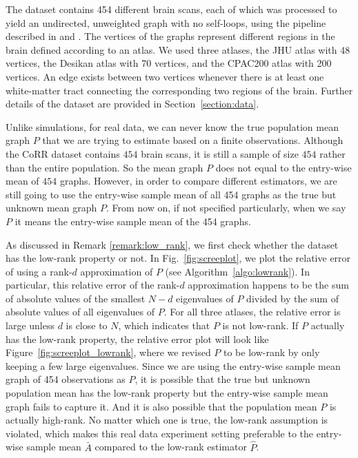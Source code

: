 \documentclass[10pt,letterpaper]{article}
\renewcommand{\hat}{\widehat}
\begin{document}
The dataset contains 454 different brain scans, each of which was processed to yield an undirected, unweighted graph with no self-loops, using the pipeline described in \citet{gray2013migraine} and \citet{kiar2016m2g}.
The vertices of the graphs represent different regions in the brain defined according to an atlas.
We used three atlases, the JHU atlas with 48 vertices, the Desikan atlas with 70 vertices, and the  CPAC200 atlas with 200 vertices.
An edge exists between two vertices whenever there is at least one white-matter tract connecting the corresponding two regions of the brain. 
Further details of the dataset are provided in Section~\ref{section:data}.

Unlike simulations, for real data, we can never know the true population mean graph $P$ that we are trying to estimate based on a finite observations. Although the CoRR dataset contains $454$ brain scans, it is still a sample of size $454$ rather than the entire population. So the mean graph $P$ does not equal to the entry-wise mean of $454$ graphs. However, in order to compare different estimators, we are still going to use the entry-wise sample mean of all 454 graphs as the true but unknown mean graph $P$. From now on, if not specified particularly, when we say $P$ it means the entry-wise sample mean of the 454 graphs.

As discussed in Remark \ref{remark:low_rank}, we first check whether the dataset has the low-rank property or not. In Fig.~\ref{fig:screeplot}, we plot the relative error of using a rank-$d$ approximation of $P$ (see Algorithm~\ref{algo:lowrank}). In particular, this relative error of the rank-$d$ approximation happens to be the sum of absolute values of the smallest $N - d$ eigenvalues of $P$ divided by the sum of absolute values of all eigenvalues of $P$.
For all three atlases, the relative error is large unless $d$ is close to $N$, which indicates that $P$ is not low-rank. If $P$ actually has the low-rank property, the relative error plot will look like Figure~\ref{fig:screeplot_lowrank}, where we revised $P$ to be low-rank by only keeping a few large eigenvalues. Since we are using the entry-wise sample mean graph of 454 observations as $P$, it is possible that the true but unknown population mean has the low-rank property but the entry-wise sample mean graph fails to capture it. And it is also possible that the population mean $P$ is actually high-rank. No matter which one is true, the low-rank assumption is violated, which makes this real data experiment setting preferable to the entry-wise sample mean $\bar{A}$ compared to the low-rank estimator $\hat{P}$.
\end{document}
